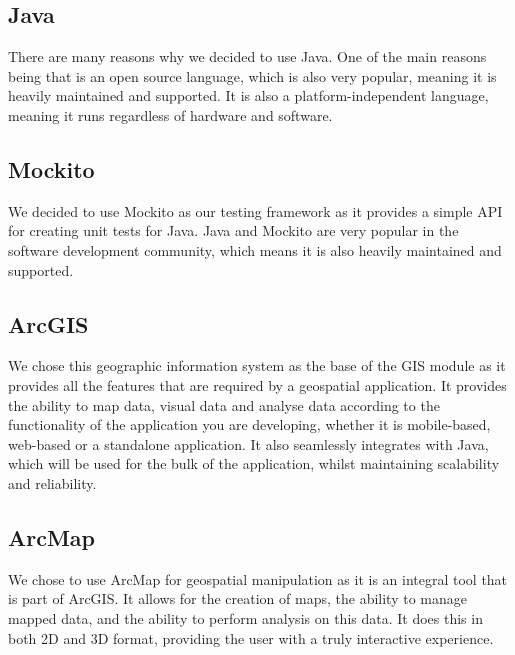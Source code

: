 \documentclass[a4paper,10pt]{article}
\begin{document}
	\subsection{Java}
		There are many reasons why we decided to use Java. One of the main reasons being that is an open source language, which is also very popular, meaning it is heavily maintained and supported. It is also a platform-independent language, meaning it runs regardless of hardware and software.
	\subsection{Mockito}
		We decided to use Mockito as our testing framework as it provides a simple API for creating unit tests for Java. Java and Mockito are very popular in the software development community, which means it is also heavily maintained and supported.
	\subsection{ArcGIS}
		We chose this geographic information system as the base of the GIS module as it provides all the features that are required by a geospatial application. It provides the ability to map data, visual data and analyse data according to the functionality of the application you are developing, whether it is mobile-based, web-based or a standalone application. It also seamlessly integrates with Java, which will be used for the bulk of the application, whilst maintaining scalability and reliability.
	\subsection{ArcMap}
		We chose to use ArcMap for geospatial manipulation as it is an integral tool that is part of ArcGIS. It allows for the creation of maps, the ability to manage mapped data, and the ability to perform analysis on this data. It does this in both 2D and 3D format, providing the user with a truly interactive experience.
\end{document}
